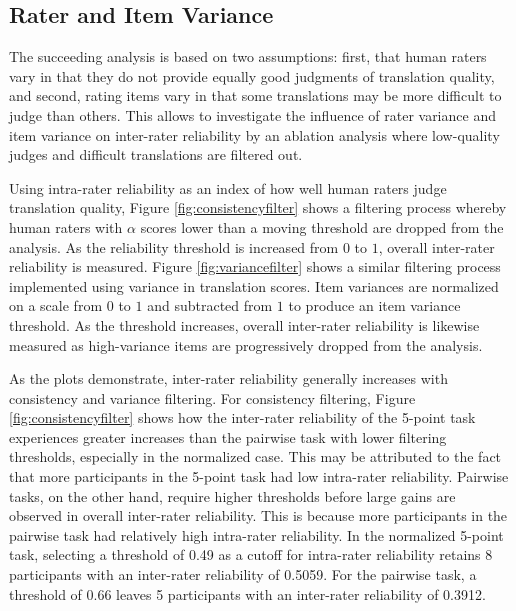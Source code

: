 \subsection{Rater and Item Variance} The succeeding analysis is based on two assumptions: first, that human raters vary in that they do not provide equally good judgments of translation quality, and second, rating items vary in that some translations may be more difficult to judge than others. This allows to investigate the influence of rater variance and item variance on inter-rater reliability by an ablation analysis where low-quality judges and difficult translations are filtered out.

Using intra-rater reliability as an index of how well human raters judge translation quality, Figure \ref{fig:consistencyfilter} shows a filtering process whereby human raters with $\alpha$ scores lower than a moving threshold are dropped from the analysis. As the reliability threshold is increased from $0$ to $1$, overall inter-rater reliability is measured. Figure \ref{fig:variancefilter} shows a similar filtering process implemented using variance in translation scores. Item variances are normalized on a scale from $0$ to $1$ and subtracted from $1$ to produce an item variance threshold. As the threshold increases, overall inter-rater reliability is likewise measured as high-variance items are progressively dropped from the analysis.

As the plots demonstrate, inter-rater reliability generally increases with consistency and variance filtering. For consistency filtering, Figure \ref{fig:consistencyfilter} shows how the inter-rater reliability of the 5-point task experiences greater increases than the pairwise task with lower filtering thresholds, especially in the normalized case. This may be attributed to the fact that more participants in the 5-point task had low intra-rater reliability. Pairwise tasks, on the other hand, require higher thresholds before large gains are observed in overall inter-rater reliability. This is because more participants in the pairwise task had relatively high intra-rater reliability. In the normalized 5-point task, selecting a threshold of 0.49 as a cutoff for intra-rater reliability retains 8 participants with an inter-rater reliability of 0.5059. For the pairwise task, a threshold of 0.66 leaves 5 participants with an inter-rater reliability of 0.3912.

